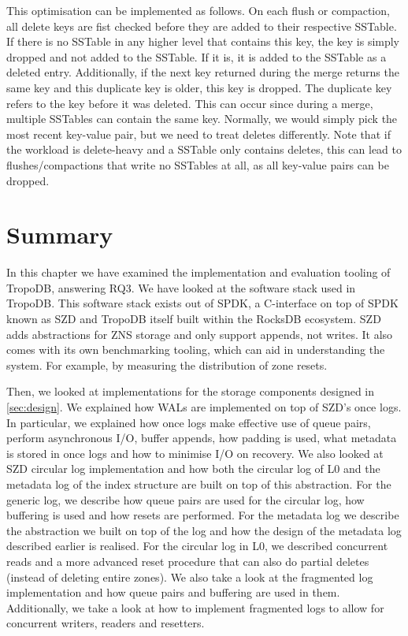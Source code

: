This optimisation can be implemented as follows. On each flush or compaction, all delete keys are fist checked before they are added to their respective SSTable. If there is no SSTable in any higher level that contains this key, the key is simply dropped and not added to the SSTable. If it is, it is added to the SSTable as a deleted entry. Additionally, if the next key returned during the merge returns the same key and this duplicate key is older, this key is dropped. The duplicate key refers to the key before it was deleted. This can occur since during a merge, multiple SSTables can contain the same key. Normally, we would simply pick the most recent key-value pair, but we need to treat deletes differently. Note that if the workload is delete-heavy and a SSTable only contains deletes, this can lead to flushes/compactions that write no SSTables at all, as all key-value pairs can be dropped.


\section{Summary}
In this chapter we have examined the implementation and evaluation tooling of TropoDB, answering RQ3. We have looked at the software stack used in TropoDB. This software stack exists out of SPDK, a C-interface on top of SPDK known as SZD and TropoDB itself built within the RocksDB ecosystem. SZD adds abstractions for ZNS storage and only support appends, not writes. It also comes with its own benchmarking tooling, which can aid in understanding the system. For example, by measuring the distribution of zone resets.

Then, we looked at implementations for the storage components designed in \autoref{sec:design}. We explained how WALs are implemented on top of SZD's once logs. In particular, we explained how once logs make effective use of queue pairs, perform asynchronous I/O, buffer appends, how padding is used, what metadata is stored in once logs and how to minimise I/O on recovery. We also looked at SZD circular log implementation and how both the circular log of L0 and the metadata log of the index structure are built on top of this abstraction. For the generic log, we describe how queue pairs are used for the circular log, how buffering is used and how resets are performed. For the metadata log we describe the abstraction we built on top of the log and how the design of the metadata log described earlier is realised. For the circular log in L0, we described concurrent reads and a more advanced reset procedure that can also do partial deletes (instead of deleting entire zones). We also take a look at the fragmented log implementation and how queue pairs and buffering are used in them. Additionally, we take a look at how to implement fragmented logs to allow for concurrent writers, readers and resetters. 

